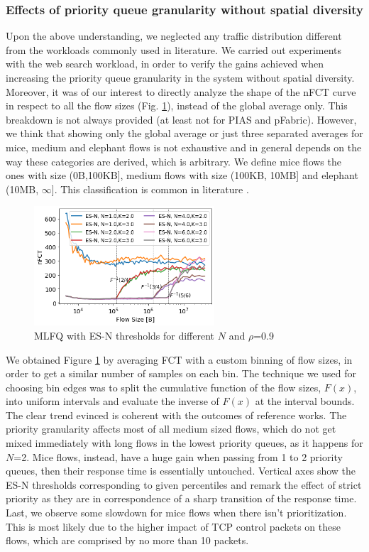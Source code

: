 \subsubsection{Effects of priority queue granularity without spatial diversity}
Upon the above understanding, we neglected any traffic distribution different from the workloads commonly used in literature. We carried out experiments with the web search workload, in order to verify the gains achieved when increasing the priority queue granularity in the system without spatial diversity. Moreover, it was of our interest to directly analyze the shape of the nFCT curve in respect to all the flow sizes (Fig. \ref{fig:esn_varying_N}), instead of the global average only. This breakdown is not always provided (at least not for PIAS and pFabric). However, we think that showing only the global average or just three separated averages for mice, medium and elephant flows is not exhaustive and in general depends on the way these categories are derived, which is arbitrary. We define mice flows the ones with size (0B,100KB], medium flows with size (100KB, 10MB] and elephant (10MB, $\infty$]. This classification is common in literature \cite{pias, nos2, one-more-queue}.\\
\begin{figure}[h]
	\centering
	\includegraphics[width=0.6\textwidth]{Chapter4/Figures/esn}
	\caption{MLFQ with ES-N thresholds for different $N$ and $\rho$=0.9}
	\label{fig:esn_varying_N}
\end{figure}%
We obtained Figure \ref{fig:esn_varying_N} by averaging FCT with a custom binning of flow sizes, in order to get a similar number of samples on each bin. The technique we used for choosing bin edges was to split the cumulative function of the flow sizes, $F(x)$, into uniform intervals and evaluate the inverse of $F(x)$ at the interval bounds. The clear trend evinced is coherent with the outcomes of reference works. The priority granularity affects most of all medium sized flows, which do not get mixed immediately with long flows in the lowest priority queues, as it happens for $N$=2. Mice flows, instead, have a huge gain when passing from 1 to 2 priority queues, then their response time is essentially untouched. Vertical axes show the ES-N thresholds corresponding to given percentiles and remark the effect of strict priority as they are in correspondence of a sharp transition of the response time. Last, we observe some slowdown for mice flows when there isn't prioritization. This is most likely due to the higher impact of TCP control packets on these flows, which are comprised by no more than 10 packets.
